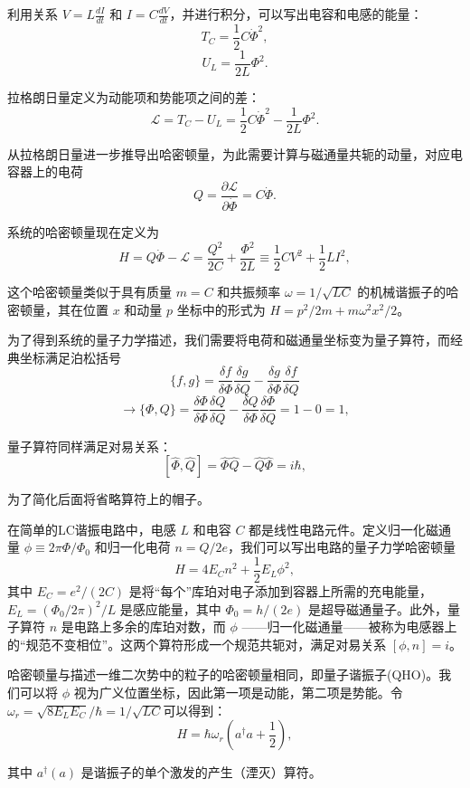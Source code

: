 利用关系 \(V = L \frac{dI}{dt}\) 和 \(I = C \frac{dV}{dt}\)，并进行积分，可以写出电容和电感的能量：
\[
T_C = \frac{1}{2} C \dot{\Phi}^2,
\]
\[
U_L = \frac{1}{2L} \Phi^2.
\]

拉格朗日量定义为动能项和势能项之间的差：
\[
\mathcal{L} = T_C - U_L = \frac{1}{2} C \dot{\Phi}^2 - \frac{1}{2L} \Phi^2.
\]

从拉格朗日量进一步推导出哈密顿量，为此需要计算与磁通量共轭的动量，对应电容器上的电荷
\[
Q = \frac{\partial \mathcal{L}}{\partial \dot{\Phi}} = C \dot{\Phi}.
\]

系统的哈密顿量现在定义为
\[
H = Q \dot{\Phi} - \mathcal{L} = \frac{Q^2}{2C} + \frac{\Phi^2}{2L} \equiv \frac{1}{2} CV^2 + \frac{1}{2} LI^2,
\]

这个哈密顿量类似于具有质量 \(m = C\) 和共振频率 \(\omega = 1/\sqrt{LC}\) 的机械谐振子的哈密顿量，其在位置 \(x\) 和动量 \(p\) 坐标中的形式为 \(H = p^2/2m + m\omega^2x^2/2\)。

为了得到系统的量子力学描述，我们需要将电荷和磁通量坐标变为量子算符，而经典坐标满足泊松括号
\[
\{f,g\} = \frac{\delta f}{\delta \Phi} \frac{\delta g}{\delta Q} - \frac{\delta g}{\delta \Phi} \frac{\delta f}{\delta Q}
\]
\[
\rightarrow \{\Phi, Q\} = \frac{\delta \Phi}{\delta \Phi} \frac{\delta Q}{\delta Q} - \frac{\delta Q}{\delta \Phi} \frac{\delta \Phi}{\delta Q} = 1 - 0 = 1,
\]

量子算符同样满足对易关系：
\[
[\hat{\Phi}, \hat{Q}] = \hat{\Phi}\hat{Q} - \hat{Q}\hat{\Phi} = i\hbar,
\]

为了简化后面将省略算符上的帽子。

在简单的LC谐振电路中，电感 \(L\) 和电容 \(C\) 都是线性电路元件。定义归一化磁通量 \(\phi \equiv 2\pi \Phi/\Phi_0\) 和归一化电荷 \(n = Q/2e\)，我们可以写出电路的量子力学哈密顿量
\[
H = 4E_C n^2 + \frac{1}{2} E_L \phi^2,
\]
其中 \(E_C = e^2/(2C)\) 是将“每个”库珀对电子添加到容器上所需的充电能量，\(E_L = (\Phi_0/2\pi)^2/L\) 是感应能量，其中 \(\Phi_0 = h/(2e)\) 是超导磁通量子。此外，量子算符 \(n\) 是电路上多余的库珀对数，而 \(\phi\) ——归一化磁通量——被称为电感器上的“规范不变相位”。这两个算符形成一个规范共轭对，满足对易关系 \([\phi, n] = i\)。

哈密顿量与描述一维二次势中的粒子的哈密顿量相同，即量子谐振子(QHO)。我们可以将 \(\phi\) 视为广义位置坐标，因此第一项是动能，第二项是势能。令$\omega_r = \sqrt{8 E_L E_C}/\hbar = 1/\sqrt{LC}$可以得到：
\[
H = \hbar \omega_r \left( a^\dagger a + \frac{1}{2} \right),
\]

其中 $a^\dagger (a)$ 是谐振子的单个激发的产生（湮灭）算符。

